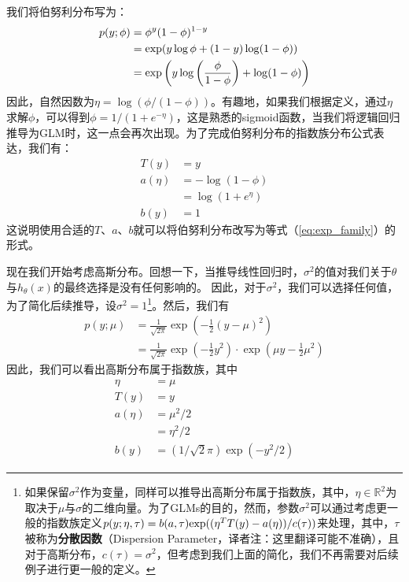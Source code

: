 我们将伯努利分布写为：
\begin{equation}
  \begin{aligned}
    p(y;\phi) & = \phi^y (1-\phi)^{1-y}                                                            \\
              & ={\rm exp}(y \log \phi + (1-y) \log(1-\phi))                                       \\
              & ={\rm exp} \left( y \log \left( \frac{\phi}{1-\phi} \right) + \log(1-\phi) \right)
  \end{aligned}
\end{equation}
因此，自然因数为$\eta=\log(\phi / (1-\phi))$。有趣地，如果我们根据定义，通过$\eta$求解$\phi$，可以得到$\phi=1 / (1+e^{-\eta})$，这是熟悉的sigmoid函数，当我们将逻辑回归推导为GLM时，这一点会再次出现。为了完成伯努利分布的指数族分布公式表达，我们有：
\begin{align*}
  T(y)    & = y               \\
  a(\eta) & = -\log(1-\phi)   \\
          & =  \log(1+e^\eta) \\
  b(y)    & =1
\end{align*}
这说明使用合适的$T$、$a$、$b$就可以将伯努利分布改写为等式（\ref{eq:exp_family}）的形式。

现在我们开始考虑高斯分布。回想一下，当推导线性回归时，$\sigma^2$的值对我们关于$\theta$与$h_\theta(x)$的最终选择是没有任何影响的。
因此，对于$\sigma^2$，我们可以选择任何值，为了简化后续推导，设$\sigma^2=1$\footnote{如果保留$\sigma^2$作为变量，同样可以推导出高斯分布属于指数族，其中，$\eta \in \mathbb{R}^2$为取决于$\mu$与$\sigma$的二维向量。为了GLMs的目的，然而，参数$\sigma^2$可以通过考虑更一般的指数族定义$p(y;\eta,\tau)=b(a,\tau){\rm exp}((\eta^T T(y) - a(\eta))/c(\tau))$来处理，其中，$\tau$被称为\textbf{分散因数}（Dispersion Parameter，译者注：这里翻译可能不准确），且对于高斯分布，$c(\tau)=\sigma^2$，但考虑到我们上面的简化，我们不再需要对后续例子进行更一般的定义。}。然后，我们有
\begin{align*}
  p(y;\mu) & =\frac{1}{\sqrt{2\pi}}\exp \left( -\frac{1}{2} (y-\mu)^2 \right)                                               \\
           & =\frac{1}{\sqrt{2\pi}}\exp \left( -\frac{1}{2} y^2 \right) \cdot \exp \left( \mu y - \frac{1}{2} \mu^2 \right)
\end{align*}
因此，我们可以看出高斯分布属于指数族，其中
\begin{align*}
  \eta    & = \mu                            \\
  T(y)    & = y                              \\
  a(\eta) & = \mu^2 / 2                      \\
          & = \eta^2 / 2                     \\
  b(y)    & = (1/\sqrt{2}\pi) \exp (- y^2/2)
\end{align*}

